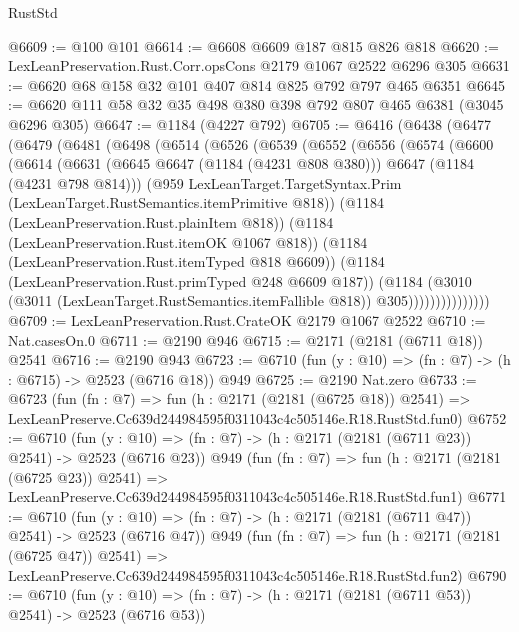 \begin{lexlean}{RustStd}
\begin{coremodule}
@6609 := @100 @101
@6614 := @6608 @6609 @187 @815 @826 @818
@6620 := LexLeanPreservation.Rust.Corr.opsCons @2179 @1067 @2522 @6296 @305
@6631 := @6620 @68 @158 @32 @101 @407 @814 @825 @792 @797 @465 @6351
@6645 := @6620 @111 @58 @32 @35 @498 @380 @398 @792 @807 @465 @6381 (@3045 @6296 @305)
@6647 := @1184 (@4227 @792)
@6705 := @6416
    (@6438
      (@6477
        (@6479
          (@6481
            (@6498
              (@6514
                (@6526
                  (@6539
                    (@6552
                      (@6556
                        (@6574
                          (@6600
                            (@6614
                              (@6631
                                (@6645 @6647 (@1184 (@4231 @808 @380)))
                                @6647
                                (@1184 (@4231 @798 @814)))
                              (@959
                                LexLeanTarget.TargetSyntax.Prim
                                (LexLeanTarget.RustSemantics.itemPrimitive @818))
                              (@1184 (LexLeanPreservation.Rust.plainItem @818))
                              (@1184 (LexLeanPreservation.Rust.itemOK @1067 @818))
                              (@1184 (LexLeanPreservation.Rust.itemTyped @818 @6609))
                              (@1184 (LexLeanPreservation.Rust.primTyped @248 @6609 @187))
                              (@1184
                                (@3010
                                  (@3011 (LexLeanTarget.RustSemantics.itemFallible @818))
                                  @305)))))))))))))))
@6709 := LexLeanPreservation.Rust.CrateOK @2179 @1067 @2522
@6710 := Nat.casesOn.{0}
@6711 := @2190 @946
@6715 := @2171 (@2181 (@6711 @18)) @2541
@6716 := @2190 @943
@6723 := @6710 (fun (y : @10) => (fn : @7) -> (h : @6715) -> @2523 (@6716 @18)) @949
@6725 := @2190 Nat.zero
@6733 := @6723
    (fun (fn : @7) =>
    fun (h : @2171 (@2181 (@6725 @18)) @2541) =>
    LexLeanPreserve.Cc639d244984595f0311043c4c505146e.R18.RustStd.fun0)
@6752 := @6710
    (fun (y : @10) => (fn : @7) -> (h : @2171 (@2181 (@6711 @23)) @2541) -> @2523 (@6716 @23))
    @949
    (fun (fn : @7) =>
    fun (h : @2171 (@2181 (@6725 @23)) @2541) =>
    LexLeanPreserve.Cc639d244984595f0311043c4c505146e.R18.RustStd.fun1)
@6771 := @6710
    (fun (y : @10) => (fn : @7) -> (h : @2171 (@2181 (@6711 @47)) @2541) -> @2523 (@6716 @47))
    @949
    (fun (fn : @7) =>
    fun (h : @2171 (@2181 (@6725 @47)) @2541) =>
    LexLeanPreserve.Cc639d244984595f0311043c4c505146e.R18.RustStd.fun2)
@6790 := @6710
    (fun (y : @10) => (fn : @7) -> (h : @2171 (@2181 (@6711 @53)) @2541) -> @2523 (@6716 @53))

\end{coremodule}
\end{lexlean}

